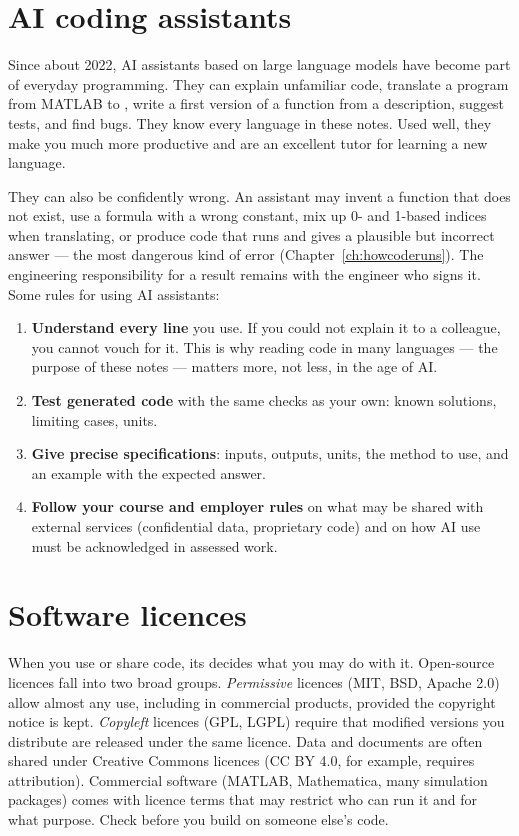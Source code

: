 \section{AI coding assistants}
\label{sec:ai-assistants}

Since about 2022, AI assistants based on large language models have become part of
everyday programming. They can explain unfamiliar code, translate a program from MATLAB to
\py, write a first version of a function from a description, suggest tests, and find bugs.
They know every language in these notes. Used well, they make you much more productive and
are an excellent tutor for learning a new language.

They can also be confidently wrong. An assistant may invent a function that does not
exist, use a formula with a wrong constant, mix up 0- and 1-based indices when translating,
or produce code that runs and gives a plausible but incorrect answer --- the most dangerous
kind of error (Chapter~\ref{ch:howcoderuns}). The engineering responsibility for a result
remains with the engineer who signs it. Some rules for using AI assistants:
\begin{enumerate}
\item \textbf{Understand every line} you use. If you could not explain it to a colleague,
  you cannot vouch for it. This is why reading code in many languages --- the purpose of
  these notes --- matters more, not less, in the age of AI.
\item \textbf{Test generated code} with the same checks as your own: known solutions,
  limiting cases, units.
\item \textbf{Give precise specifications}: inputs, outputs, units, the method to use, and
  an example with the expected answer.
\item \textbf{Follow your course and employer rules} on what may be shared with external
  services (confidential data, proprietary code) and on how AI use must be acknowledged in
  assessed work.
\end{enumerate}

\section{Software licences}

When you use or share code, its  decides what you may do with it. Open-source
licences fall into two broad groups. \emph{Permissive} licences (MIT, BSD, Apache 2.0) allow
almost any use, including in commercial products, provided the copyright notice is kept.
\emph{Copyleft} licences (GPL, LGPL) require that modified versions you distribute are
released under the same licence. Data and documents are often shared under Creative Commons
licences (CC BY 4.0, for example, requires attribution). Commercial software (MATLAB,
Mathematica, many simulation packages) comes with licence terms that may restrict who can
run it and for what purpose. Check before you build on someone else's code.

